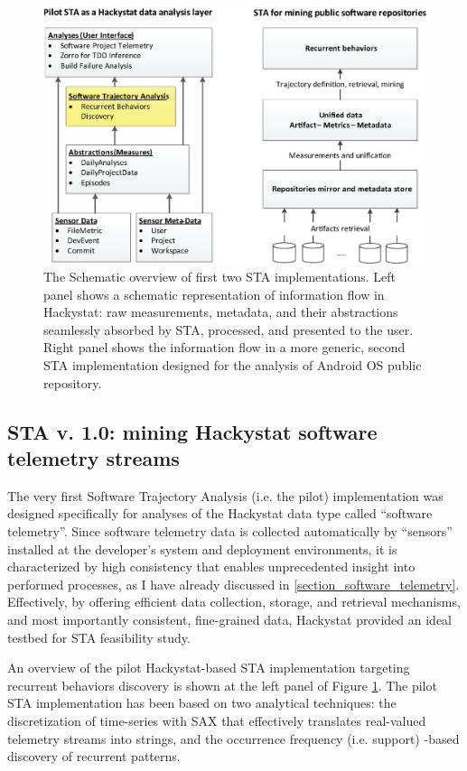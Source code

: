 \begin{figure}[t]
   \centering
   \includegraphics[width=150mm]{figures/STA12-schema-draft.eps}
   \caption{The Schematic overview of first two STA implementations. 
   Left panel shows a schematic representation of information flow in Hackystat: raw measurements, metadata, 
   and their abstractions seamlessly absorbed by STA, processed, and presented to the user.
   Right panel shows the information flow in a more generic, second STA implementation designed for the 
   analysis of Android OS public repository.}
   \label{fig:STA12-schema}
\end{figure}

\subsection{STA v. 1.0: mining Hackystat software telemetry streams}
The very first Software Trajectory Analysis (i.e. the pilot) implementation was designed specifically for analyses 
of the Hackystat data type called ``software telemetry''. Since software telemetry data is collected automatically 
by ``sensors'' installed at the developer's system and deployment environments, it is characterized by high 
consistency that enables unprecedented insight into performed processes, 
as I have already discussed in \ref{section_software_telemetry}. 
Effectively, by offering efficient data collection, storage, and retrieval mechanisms, and most importantly consistent, 
fine-grained data, Hackystat provided an ideal testbed for STA feasibility study.

An overview of the pilot Hackystat-based STA implementation targeting recurrent behaviors discovery is shown 
at the left panel of Figure  \ref{fig:STA12-schema}.
The pilot STA implementation has been based on two analytical techniques: the discretization of time-series with SAX \cite{sax} 
that effectively translates real-valued telemetry streams into strings, and the occurrence frequency (i.e. support) -based 
discovery of recurrent patterns.

